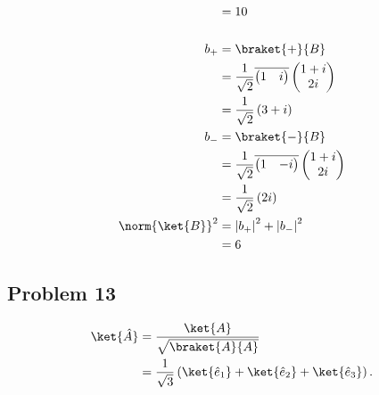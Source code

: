 \documentclass[10pt]{mypackage}
\begin{document}
\begin{enumerate}[(a)]
\begin{align*}
                       &= 10\\
                       \\
      b_{+} &= \braket{+}{B}\\
            &= \frac{1}{\sqrt{2}} \overline{ \begin{pmatrix}1 & i\end{pmatrix} } \begin{pmatrix}1+i\\2i\end{pmatrix}\\
            &= \frac{1}{\sqrt{2}} \left(3+i\right)\\
      b_{-} &= \braket{-}{B}\\
            &= \frac{1}{\sqrt{2}} \overline{ \begin{pmatrix}1 & -i\end{pmatrix} } \begin{pmatrix}1 + i \\ 2i\end{pmatrix}\\
            &= \frac{1}{\sqrt{2}} \left(2i\right)\\
      \norm{\ket{B}}^2 &= \left\vert b_{+} \right\vert^2 + \left\vert b_{-} \right\vert^2\\
                       &= 6
    \end{align*}
\end{enumerate}
\subsection{Problem 13}%
\begin{align*}
  \ket{\hat{A}} &= \frac{\ket{A}}{\sqrt{\braket{A}{A}}}\\
                &= \frac{1}{\sqrt{3}}\left(\ket{\hat{e}_1} + \ket{\hat{e}_2} + \ket{\hat{e}_{3}}\right).
\end{align*}
\end{document}
